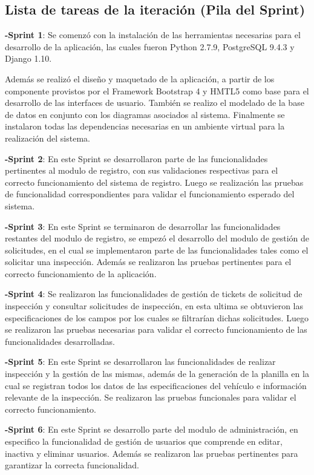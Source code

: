 \subsection{Lista de tareas de la iteración (Pila del Sprint)}
\setlength{\parskip}{5mm}

\textbf{-Sprint 1}: Se comenzó con la instalación de las herramientas necesarias para el desarrollo de la aplicación, las cuales fueron Python 2.7.9, PostgreSQL 9.4.3 y Django 1.10. 

Además se realizó el diseño y maquetado de la aplicación, a partir de los componente provistos por el Framework Bootstrap 4 y HMTL5 como base para el desarrollo de las interfaces de usuario. También se realizo el modelado de la base de datos en conjunto con los diagramas asociados al sistema. Finalmente se instalaron todas las dependencias necesarias en un ambiente virtual para la realización del sistema.


\textbf{-Sprint 2}: En este Sprint se desarrollaron parte de las funcionalidades pertinentes al modulo de registro, con sus validaciones respectivas para el correcto funcionamiento del sistema de registro. Luego se realización las pruebas de funcionalidad correspondientes para validar el funcionamiento esperado del sistema.

\textbf{-Sprint 3}: En este Sprint se terminaron de desarrollar las funcionalidades restantes del modulo de registro, se empezó el desarrollo del modulo de gestión de solicitudes, en el cual se implementaron parte de las funcionalidades tales como el solicitar una inspección. Además se realizaron las pruebas pertinentes para el correcto funcionamiento de la aplicación.

\textbf{-Sprint 4}: Se realizaron las funcionalidades de gestión de tickets de solicitud de inspección y consultar solicitudes de inspección, en esta ultima se obtuvieron las especificaciones de los campos por los cuales se filtrarían dichas solicitudes. Luego se realizaron las pruebas necesarias para validar el correcto funcionamiento de las funcionalidades desarrolladas.

\textbf{-Sprint 5}: En este Sprint se desarrollaron las funcionalidades de realizar inspección y la gestión de las mismas, además de la generación de la planilla en la cual se registran todos los datos de las especificaciones del vehículo e información relevante de la inspección. Se realizaron las pruebas funcionales para validar el correcto funcionamiento.

\textbf{-Sprint 6}: En este Sprint se desarrollo parte del modulo de administración, en especifico la funcionalidad de gestión de usuarios que comprende en editar, inactiva y eliminar usuarios. Además se realizaron las pruebas pertinentes para garantizar la correcta funcionalidad.


